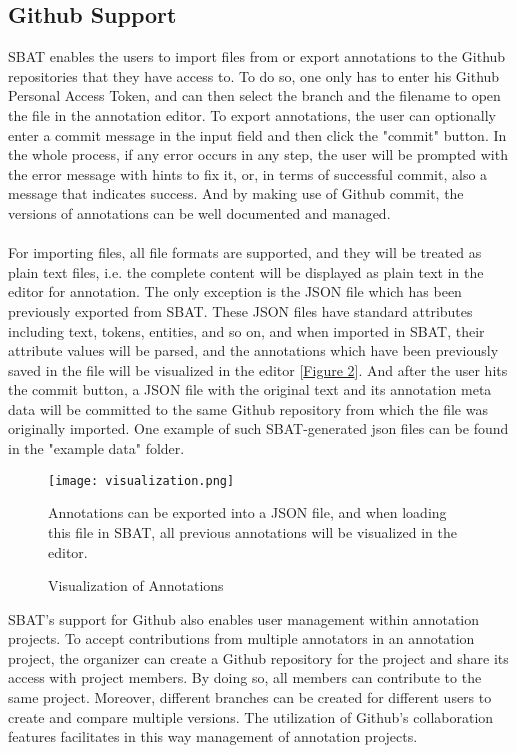 \documentclass[12ptm a4paper]{article}
\begin{document}
\subsection{Github Support}
SBAT enables the users to import files from or export annotations to the Github repositories that they have access to. To do so, one only has to enter his Github Personal Access Token, and can then select the branch and the filename to open the file in the annotation editor. To export annotations, the user can optionally enter a commit message in the input field and then click the "commit" button. In the whole process, if any error occurs in any step, the user will be prompted with the error message with hints to fix it, or, in terms of successful commit, also a message that indicates success. And by making use of Github commit, the versions of annotations can be well documented and managed.\\
\\
For importing files, all file formats are supported, and they will be treated as plain text files, i.e. the complete content will be displayed as plain text in the editor for annotation. The only exception is the JSON file which has been previously exported from SBAT. These JSON files have standard attributes including text, tokens, entities, and so on, and when imported in SBAT, their attribute values will be parsed, and the annotations which have been previously saved in the file will be visualized in the editor [\hyperref[figure2]{Figure 2}]. And after the user hits the commit button, a JSON file with the original text and its annotation meta data will be committed to the same Github repository from which the file was originally imported. One example of such SBAT-generated json files can be found in the "example data" folder.

\begin{figure}[H]
{\centering
\texttt{[image: visualization.png]}
\label{figure2}
\caption{Visualization of Annotations}
}
{\scriptsize Annotations can be exported into a JSON file, and when loading this file in SBAT, all previous annotations will be visualized in the editor.\par}
\end{figure}

SBAT's support for Github also enables user management within annotation projects. To accept contributions from multiple annotators in an annotation project, the organizer can create a Github repository for the project and share its access with project members. By doing so, all members can contribute to the same project. Moreover, different branches can be created for different users to create and compare multiple versions. The utilization of Github's collaboration features facilitates in this way management of annotation projects.
\end{document}
